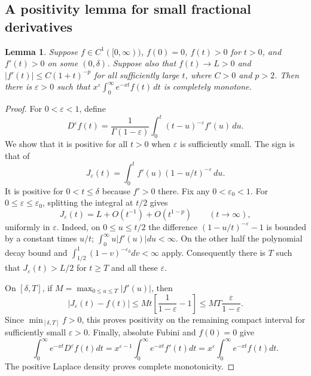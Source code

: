 \documentclass[11pt,a4paper]{article}
\newtheorem{lemma}[theorem]{Lemma}
\theoremstyle{definition}
\theoremstyle{remark}
\numberwithin{equation}{section}
\begin{document}
\subsection{A positivity lemma for small fractional derivatives}
\begin{lemma}\label{p8:frontier:fractional}
Suppose $f\in C^1([0,\infty))$, $f(0)=0$, $f(t)>0$ for $t>0$, and
$f'(t)>0$ on some $(0,\delta)$. Suppose also that $f(t)\to L>0$ and
$|f'(t)|\leq C(1+t)^{-p}$ for all sufficiently large $t$, where
$C>0$ and $p>2$. Then there is $\varepsilon>0$ such that
$x^\varepsilon\int_0^\infty e^{-xt}f(t)\,dt$ is completely monotone.
\end{lemma}
\begin{proof}
For $0<\varepsilon<1$, define
\[
 D^\varepsilon f(t)=\frac1{\Gamma(1-\varepsilon)}
     \int_0^t(t-u)^{-\varepsilon}f'(u)\,du.
\]
We show that it is positive for all $t>0$ when $\varepsilon$ is
sufficiently small. The sign is that of
\[
 J_\varepsilon(t)=\int_0^t f'(u)(1-u/t)^{-\varepsilon}\,du.
\]
It is positive for $0<t\leq\delta$ because $f'>0$ there. Fix any
$0<\varepsilon_0<1$. For $0\leq\varepsilon\leq\varepsilon_0$, splitting
the integral at $t/2$ gives
\[
 J_\varepsilon(t)=L+O(t^{-1})
                  +O(t^{1-p})
                  \qquad(t\to\infty),
\]
uniformly in $\varepsilon$. Indeed, on $0\leq u\leq t/2$ the difference
$(1-u/t)^{-\varepsilon}-1$ is bounded by a constant times $u/t$;
$\int_0^\infty u|f'(u)|du<\infty$. On the other half the polynomial decay
bound and $\int_{1/2}^1(1-v)^{-\varepsilon_0}dv<\infty$ apply.
Consequently there is $T$ such that $J_\varepsilon(t)>L/2$ for $t\geq T$
and all these $\varepsilon$.

On $[\delta,T]$, if $M=\max_{0\leq u\leq T}|f'(u)|$, then
\[
 |J_\varepsilon(t)-f(t)|
 \leq Mt\left[\frac1{1-\varepsilon}-1\right]
 \leq MT\frac{\varepsilon}{1-\varepsilon}.
\]
Since $\min_{[\delta,T]}f>0$, this proves positivity on the remaining
compact interval for sufficiently small $\varepsilon>0$.
Finally, absolute Fubini and $f(0)=0$ give
\[
 \int_0^\infty e^{-xt}D^\varepsilon f(t)dt
 =x^{\varepsilon-1}\int_0^\infty e^{-xt}f'(t)dt
 =x^\varepsilon\int_0^\infty e^{-xt}f(t)dt.
\]
The positive Laplace density proves complete monotonicity.
\end{proof}
\end{document}

